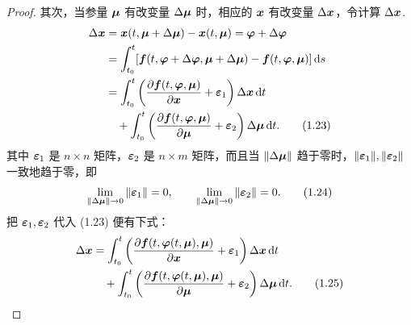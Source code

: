 \begin{proof}
	其次，当参量 $\boldsymbol{\mu}$ 有改变量 $\Delta\boldsymbol{\mu}$ 时，相应的 $\boldsymbol{x}$ 有改变量 $\Delta\boldsymbol{x}$，令计算 $\Delta\boldsymbol{x}$.
	\begin{align*}
		\Delta\boldsymbol{x} 
		&= \boldsymbol{x}(t, \boldsymbol{\mu} + \Delta\boldsymbol{\mu}) - \boldsymbol{x}(t, \boldsymbol{\mu}) = \boldsymbol{\varphi} + \Delta\boldsymbol{\varphi} \\
		&= \int_{t_0}^t [\boldsymbol{f}(t, \boldsymbol{\varphi} + \Delta\boldsymbol{\varphi}, \boldsymbol{\mu} + \Delta\boldsymbol{\mu}) - \boldsymbol{f}(t, \boldsymbol{\varphi}, \boldsymbol{\mu})]\,\mathrm{d} s \\
		&= \int_{t_0}^t \left(\frac{\partial \boldsymbol{f}(t, \boldsymbol{\varphi}, \boldsymbol{\mu})}{\partial \boldsymbol{x}} + \boldsymbol{\varepsilon}_1\right)\Delta\boldsymbol{x}\,\mathrm{d} t \\
		&\quad + \int_{t_0}^t \left(\frac{\partial \boldsymbol{f}(t, \boldsymbol{\varphi}, \boldsymbol{\mu})}{\partial \boldsymbol{\mu}} + \boldsymbol{\varepsilon}_2\right)\Delta\boldsymbol{\mu}\,\mathrm{d} t.
		\tag{1.23}
{\tiny }	\end{align*}
	其中 $\boldsymbol{\varepsilon}_1$ 是 $n \times n$ 矩阵，$\boldsymbol{\varepsilon}_2$ 是 $n \times m$ 矩阵，而且当 $\|\Delta\boldsymbol{\mu}\|$ 趋于零时，$\|\boldsymbol{\varepsilon}_1\|, \|\boldsymbol{\varepsilon}_2\|$ 一致地趋于零，即
	\[
		\lim_{\|\Delta\boldsymbol{\mu}\| \to 0} \|\boldsymbol{\varepsilon}_1\| = 0, \qquad 
		\lim_{\|\Delta\boldsymbol{\mu}\| \to 0} \|\boldsymbol{\varepsilon}_2\| = 0.
		\tag{1.24}
	\]
	把 $\boldsymbol{\varepsilon}_1, \boldsymbol{\varepsilon}_2$ 代入 (1.23) 便有下式：
	\begin{align*}
		\Delta\boldsymbol{x} 
		&= \int_{t_0}^t \left(\frac{\partial \boldsymbol{f}(t, \boldsymbol{\varphi}(t, \boldsymbol{\mu}), \boldsymbol{\mu})}{\partial \boldsymbol{x}} + \boldsymbol{\varepsilon}_1\right)\Delta\boldsymbol{x}\,\mathrm{d} t \\
		&\quad + \int_{t_0}^t \left(\frac{\partial \boldsymbol{f}(t, \boldsymbol{\varphi}(t, \boldsymbol{\mu}), \boldsymbol{\mu})}{\partial \boldsymbol{\mu}} + \boldsymbol{\varepsilon}_2\right)\Delta\boldsymbol{\mu}\,\mathrm{d} t.
		\tag{1.25}
	\end{align*}


\end{proof}
